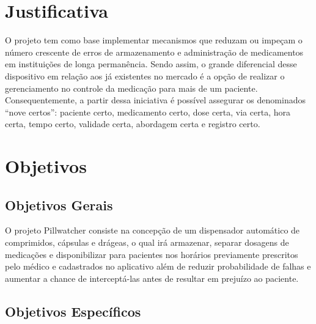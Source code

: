 \section{Justificativa}

O projeto tem como base implementar mecanismos que reduzam ou impeçam o número crescente de erros de armazenamento e administração de medicamentos em instituições de longa permanência. Sendo assim, o grande diferencial desse dispositivo em relação aos já existentes no mercado é a opção de realizar o gerenciamento no controle da medicação para mais de um paciente. Consequentemente, a partir dessa iniciativa  é possível assegurar os denominados “nove certos”: paciente certo, medicamento certo, dose certa, via certa, hora certa, tempo certo, validade certa, abordagem certa e registro certo.


\section{Objetivos}
\subsection{Objetivos Gerais}

O projeto Pillwatcher consiste na concepção de um dispensador automático de comprimidos, cápsulas e drágeas, o qual irá armazenar, separar dosagens de medicações e disponibilizar para pacientes nos horários previamente prescritos pelo médico e cadastrados no aplicativo além de reduzir probabilidade de falhas e aumentar a chance de interceptá-las antes de resultar em prejuízo ao paciente.



\subsection{Objetivos Específicos}

